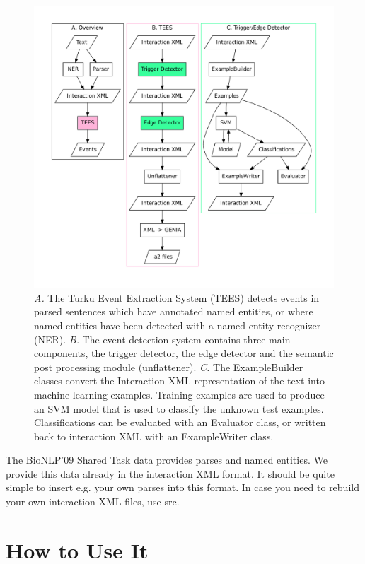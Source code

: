\documentclass[a4paper,12pt]{article}
\begin{document}
\begin{figure}[htb]
\begin{center}
\includegraphics[scale=0.4]{Figures/overview.pdf}
\end{center}
\caption{
\emph{A.} The Turku Event Extraction System (TEES) detects events
in parsed sentences which have annotated named entities, or where named
entities have been detected with a named entity recognizer (NER).
\emph{B.} The event detection system contains three main components, the
trigger detector, the edge detector and the semantic post processing module
(unflattener). 
\emph{C.} The ExampleBuilder classes convert the Interaction XML representation
of the text into machine learning examples. Training examples are used to
produce an SVM model that is used to classify the unknown test examples. Classifications can be evaluated with an Evaluator class, or written back to interaction XML with an
ExampleWriter class. }
\label{fig-overview}
\end{figure}

The BioNLP'09 Shared Task data provides parses and named entities. We provide
this data already in the interaction XML format. It should be quite simple to
insert e.g. your own parses into this format. In case you need to rebuild your
own interaction XML files, use src.

\section{How to Use It}
\end{document}
